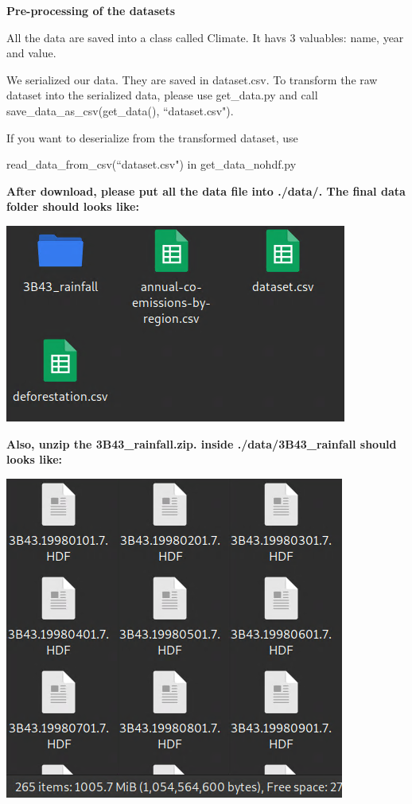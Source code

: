\documentclass[12pt]{article}
\begin{document}
\begin{enumerate}
\begin{text}
\textbf{Pre-processing of the datasets}

All the data are saved into a class called Climate. It havs 3 valuables: name, year and value.

We serialized our data. They are saved in dataset.csv. To transform the raw dataset into the serialized data, please use get\_data.py and call save\_data\_as\_csv(get\_data(), ``dataset.csv").

If you want to deserialize from the transformed dataset, use

read\_data\_from\_csv(``dataset.csv") in get\_data\_nohdf.py

\textbf{After download, please put all the data file into ./data/. The final data folder should looks like:
}

\includegraphics[scale=0.5]{./datafolder.png}

\textbf{Also, unzip the 3B43\_rainfall.zip. inside ./data/3B43\_rainfall should looks like:}

\includegraphics[scale=0.5]{./rainfallfolder.png}


\end{text}
\end{enumerate}
\end{document}
